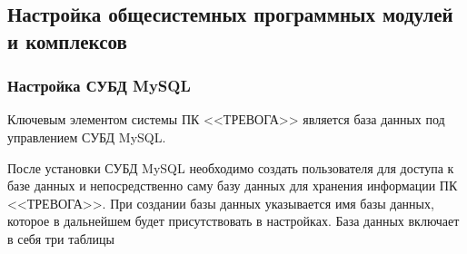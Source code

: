 ﻿\documentclass[12pt]{article}[a4paper,14pt,russian]
\begin{document}
	\subsection {Настройка общесистемных программных модулей и комплексов}
	
	\subsubsection {Настройка СУБД MySQL}
	Ключевым элементом системы ПК <<ТРЕВОГА>> является база данных под управлением СУБД MySQL. 
	
	После установки СУБД MySQL необходимо создать пользователя для доступа к базе данных и непосредственно саму базу данных для хранения информации ПК <<ТРЕВОГА>>. При создании базы данных указывается имя базы данных, которое в дальнейшем будет присутствовать в настройках. База данных включает в себя три таблицы
\end{document}
